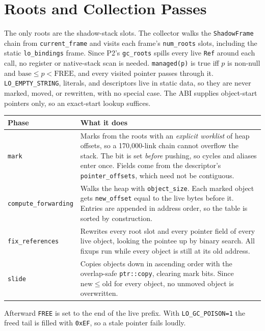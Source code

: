 \documentclass[10pt]{article}
\newcommand{\code}[1]{\texttt{\small #1}}
\begin{document}
\section{Roots and Collection Passes}
The only roots are the shadow-stack slots. The collector walks the \code{ShadowFrame} chain from \code{current\_frame} and visits each frame's \code{num\_roots} slots, including the static \code{lo\_bindings} frame. Since P2's \code{gc\_roots} spills every live \code{Ref} around each call, no register or native-stack scan is needed. \code{managed(p)} is true iff $p$ is non-null and $\mathrm{base}\le p<\mathrm{FREE}$, and every visited pointer passes through it. \code{LO\_EMPTY\_STRING}, literals, and descriptors live in static data, so they are never marked, moved, or rewritten, with no special case. The ABI supplies object-start pointers only, so an exact-start lookup suffices.

\begin{center}\small
\begin{tabularx}{\linewidth}{@{}l X@{}}
\toprule
\textbf{Phase} & \textbf{What it does} \\
\midrule
\code{mark} & Marks from the roots with an \emph{explicit worklist} of heap offsets, so a 170{,}000-link chain cannot overflow the stack. The bit is set \emph{before} pushing, so cycles and aliases enter once. Fields come from the descriptor's \code{pointer\_offsets}, which need not be contiguous. \\
\code{compute\_forwarding} & Walks the heap with \code{object\_size}. Each marked object gets \code{new\_offset} equal to the live bytes before it. Entries are appended in address order, so the table is sorted by construction. \\
\code{fix\_references} & Rewrites every root slot and every pointer field of every live object, looking the pointee up by binary search. All fixups run while every object is still at its old address. \\
\code{slide} & Copies objects down in ascending order with the overlap-safe \code{ptr::copy}, clearing mark bits. Since $\mathrm{new}\le\mathrm{old}$ for every object, no unmoved object is overwritten. \\
\bottomrule
\end{tabularx}
\end{center}
Afterward \code{FREE} is set to the end of the live prefix. With \code{LO\_GC\_POISON=1} the freed tail is filled with \code{0xEF}, so a stale pointer fails loudly.
\end{document}
